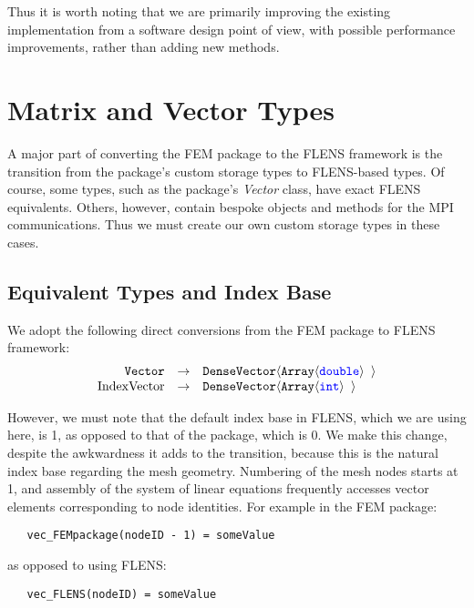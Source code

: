 Thus it is worth noting that we are primarily improving the existing implementation from a software design point of view, with possible performance improvements, rather than adding new methods.

\section{Matrix and Vector Types}

A major part of converting the FEM package to the FLENS framework is the transition from the package's custom storage types to FLENS-based types. Of course, some types, such as the package's \emph{Vector} class, have exact FLENS equivalents. Others, however, contain bespoke objects and methods for the MPI communications. Thus we must create our own custom storage types in these cases.

\subsection{Equivalent Types and Index Base}

We adopt the following direct conversions from the FEM package to FLENS framework:
\begin{equation*}
\begin{array}{rcl}
   \mbox{\texttt{Vector}}  &  \rightarrow  &  \mbox{\texttt{DenseVector$\langle$Array$\langle${\color{blue}double}$\rangle$ $\rangle$}} \\
   \mbox{IndexVector} & \rightarrow & \mbox{\texttt{DenseVector$\langle$Array$\langle${\color{blue}int}$\rangle$ $\rangle$}}
\end{array}
\end{equation*}

However, we must note that the default index base in FLENS, which we are using here, is 1, as opposed to that of the package, which is 0. We make this change, despite the awkwardness it adds to the transition, because this is the natural index base regarding the mesh geometry. Numbering of the mesh nodes starts at 1, and assembly of the system of linear equations frequently accesses vector elements corresponding to node identities. For example in the FEM package:

\begin{lstlisting}
   vec_FEMpackage(nodeID - 1) = someValue
\end{lstlisting}

as opposed to using FLENS:

\begin{lstlisting}
   vec_FLENS(nodeID) = someValue
\end{lstlisting}

